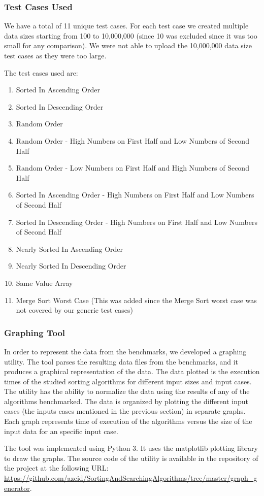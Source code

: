 \subsubsection{Test Cases Used}
We have a total of 11 unique test cases. For each test case we created multiple data sizes starting from 100 to 10,000,000 (since 10 was excluded since it was too small for any comparison). We were not able to upload the 10,000,000 data size test cases as they were too large.

The test cases used are:
\begin{enumerate}
    \item Sorted In Ascending Order
    \item Sorted In Descending Order  
    \item Random Order  
    \item Random Order - High Numbers on First Half and Low Numbers of Second Half  
    \item Random Order - Low Numbers on First Half and High Numbers of Second Half  
    \item Sorted In Ascending Order - High Numbers on First Half and Low Numbers of Second Half 
    \item Sorted In Descending Order - High Numbers on First Half and Low Numbers of Second Half 
    \item Nearly Sorted In Ascending Order
    \item Nearly Sorted In Descending Order
    \item Same Value Array
    \item Merge Sort Worst Case (This was added since the Merge Sort worst case was not covered by our generic test cases)
    
\end{enumerate}

\subsubsection{Graphing Tool}

In order to represent the data from the benchmarks, we developed a graphing utility. The tool parses the resulting data files from the benchmarks, and it produces a graphical representation of the data. The data plotted is the execution times of the studied sorting algorithms for different input sizes and input cases. The utility has the ability to normalize the data using the results of any of the algorithms benchmarked. The data is organized by plotting the different input cases (the inputs cases mentioned in the previous section) in separate graphs. Each graph represents time of execution of the algorithms versus the size of the input data for an specific input case.

The tool was implemented using Python 3. It uses the matplotlib plotting library to draw the graphs. The source code of the utility is available in the repository of the project at the following URL: \url{https://github.com/azeid/SortingAndSearchingAlgorithms/tree/master/graph_generator}.

